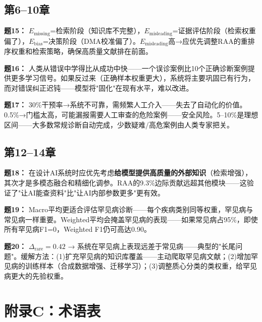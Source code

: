 \documentclass[11pt,a4paper]{ctexart}
\begin{document}
\subsection*{第6--10章}

\textbf{题15：} $E_{\text{missing}}$=检索阶段（知识库不完整），$E_{\text{misleading}}$=证据评估阶段（检索权重偏了），$E_{\text{bias}}$=决策阶段（DMA校准偏了）。$E_{\text{misleading}}$高→应优先调整RAA的重排序权重和检索策略，确保高质量文献排在前面。

\textbf{题16：} 人类从错误中学得比从成功中快——一个误诊案例比10个正确诊断案例提供更多学习信号。如果反过来（正确样本权重更大），系统将主要巩固已有行为，而对错误纠正迟钝——模型将"固化"在现有水平，难以改进。

\textbf{题17：} 30\%干预率→系统不可靠，需频繁人工介入——失去了自动化的价值。0.5\%→门槛太高，可能漏报需要人工审查的危险案例——安全风险。5--10\%是理想区间——大多数常规诊断自动完成，少数疑难/高危案例由人类专家把关。

\subsection*{第12--14章}

\textbf{题18：} 在设计AI系统时应优先考虑\textbf{给模型提供高质量的外部知识}（检索增强），其次才是多模态融合和精细化调参。RAA的9.3\%边际贡献远超其他模块——这验证了"让AI能查资料"比"让AI内部参数更多"更有效。

\textbf{题19：} Macro平均更适合评估罕见病诊断——每个疾病类别同等权重，罕见病与常见病一样重要。Weighted平均会掩盖罕见病的表现——如果常见病占95\%，即使所有罕见病F1=0，Weighted F1仍可高达0.90。

\textbf{题20：} $\Delta_{\text{rare}}=0.42$ → 系统在罕见病上表现远差于常见病——典型的"长尾问题"。缓解方法：(1)扩充罕见病的知识库覆盖——主动爬取罕见病文献；(2)增加罕见病的训练样本（合成数据增强、迁移学习）；(3)调整质心分类的类权重，给罕见病更大的先验权重。

\newpage

\section*{附录C：术语表}
\end{document}
